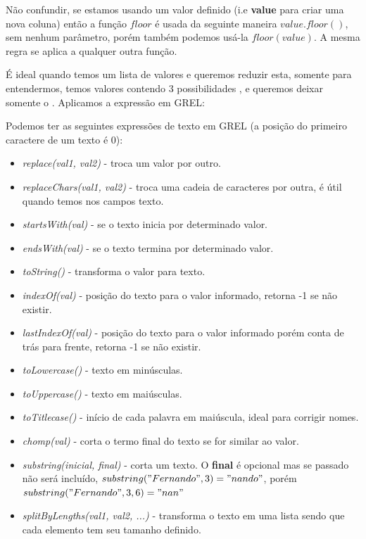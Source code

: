 \documentclass[a4paper,11pt]{article}
\begin{document}
Não confundir, se estamos usando um valor definido (i.e \textbf{value} para criar uma nova coluna) então a função $floor$ é usada da seguinte maneira $value.floor()$, sem nenhum parâmetro, porém também podemos usá-la $floor(value)$. A mesma regra se aplica a qualquer outra função.


É ideal quando temos um lista de valores e queremos reduzir esta, somente para entendermos, temos valores contendo 3 possibilidades ,  e  queremos deixar somente o . Aplicamos a expressão em GREL: \\

Podemos ter as seguintes expressões de texto em GREL (a posição do primeiro caractere de um texto é 0):
\begin{itemize}[nolistsep]
	\item \textit{replace(val1, val2)} - troca um valor por outro.
	\item \textit{replaceChars(val1, val2)} - troca uma cadeia de caracteres por outra, é útil quando temos  nos campos texto.
	\item \textit{startsWith(val)} - se o texto inicia por determinado valor.
	\item \textit{endsWith(val)} - se o texto termina por determinado valor.
	\item \textit{toString()} - transforma o valor para texto.
	\item \textit{indexOf(val)} - posição do texto para o valor informado, retorna -1 se não existir.
	\item \textit{lastIndexOf(val)} - posição do texto para o valor informado porém conta de trás para frente, retorna -1 se não existir.
	\item \textit{toLowercase()} - texto em minúsculas.
	\item \textit{toUppercase()} - texto em maiúsculas.	
	\item \textit{toTitlecase()} - início de cada palavra em maiúscula, ideal para corrigir nomes.	
	\item \textit{chomp(val)} - corta o termo final do texto se for similar ao valor.
	\item \textit{substring(inicial, final)} - corta um texto. O \textbf{final} é opcional mas se passado não será incluído, $substring("Fernando",3) = "nando"$, porém $substring("Fernando",3,6) = "nan"$
	\item \textit{splitByLengths(val1, val2, ...)} - transforma o texto em uma lista sendo que cada elemento tem seu tamanho definido.
\end{itemize}
\end{document}
